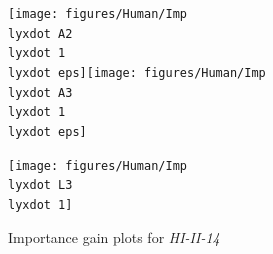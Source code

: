 \begin{figure}[h]
\noindent \begin{centering}
\caption{\label{F8-importance-H1}Importance gain plots for \emph{HI-II-14}}
\par\end{centering}
\begin{centering}
\texttt{[image: figures/Human/Imp\\lyxdot A2\\lyxdot 1\\lyxdot eps]}\texttt{[image: figures/Human/Imp\\lyxdot A3\\lyxdot 1\\lyxdot eps]}
\par\end{centering}
\centering{}\texttt{[image: figures/Human/Imp\\lyxdot L3\\lyxdot 1]}
\end{figure}